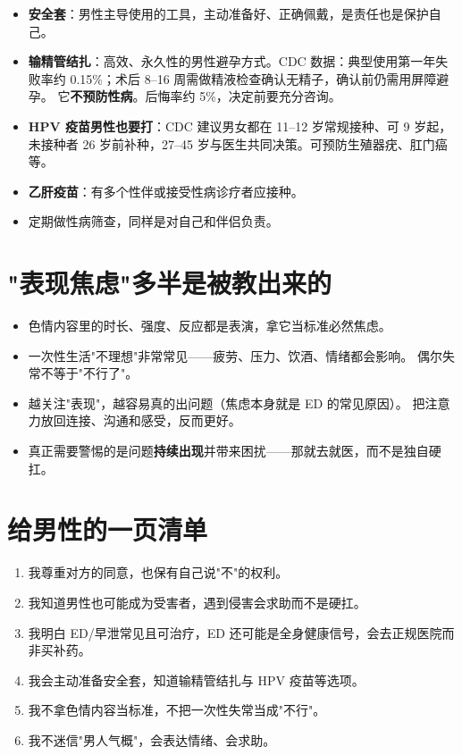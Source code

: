\documentclass[12pt,UTF8,openany]{ctexbook}
\begin{document}
\begin{itemize}[leftmargin=2em]
  \item \textbf{安全套}：男性主导使用的工具，主动准备好、正确佩戴，是责任也是保护自己。
  \item \textbf{输精管结扎}：高效、永久性的男性避孕方式。CDC 数据：典型使用第一年失败率约
        0.15\%；术后 8--16 周需做精液检查确认无精子，确认前仍需用屏障避孕。
        它\textbf{不预防性病}。后悔率约 5\%，决定前要充分咨询。
  \item \textbf{HPV 疫苗男性也要打}：CDC 建议男女都在 11--12 岁常规接种、可 9 岁起，
        未接种者 26 岁前补种，27--45 岁与医生共同决策。可预防生殖器疣、肛门癌等。
  \item \textbf{乙肝疫苗}：有多个性伴或接受性病诊疗者应接种。
  \item 定期做性病筛查，同样是对自己和伴侣负责。
\end{itemize}

\section{"表现焦虑"多半是被教出来的}

\begin{itemize}[leftmargin=2em]
  \item 色情内容里的时长、强度、反应都是表演，拿它当标准必然焦虑。
  \item 一次性生活"不理想"非常常见——疲劳、压力、饮酒、情绪都会影响。
        偶尔失常不等于"不行了"。
  \item 越关注"表现"，越容易真的出问题（焦虑本身就是 ED 的常见原因）。
        把注意力放回连接、沟通和感受，反而更好。
  \item 真正需要警惕的是问题\textbf{持续出现}并带来困扰——那就去就医，而不是独自硬扛。
\end{itemize}

\section{给男性的一页清单}

\begin{enumerate}[leftmargin=2em,itemsep=0.3em]
  \item 我尊重对方的同意，也保有自己说"不"的权利。
  \item 我知道男性也可能成为受害者，遇到侵害会求助而不是硬扛。
  \item 我明白 ED/早泄常见且可治疗，ED 还可能是全身健康信号，会去正规医院而非买补药。
  \item 我会主动准备安全套，知道输精管结扎与 HPV 疫苗等选项。
  \item 我不拿色情内容当标准，不把一次性失常当成"不行"。
  \item 我不迷信"男人气概"，会表达情绪、会求助。
\end{enumerate}
\end{document}
